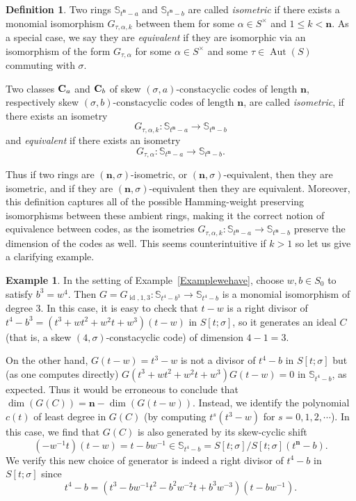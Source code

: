 \documentclass[11pt]{amsart}
\theoremstyle{plain}
\theoremstyle{definition}
\newtheorem{definition}[theorem]{Definition}
\newtheorem{example}[theorem]{Example}
\numberwithin{equation}{section}
\numberwithin{figure}{section}
\newcommand{\Sone}[1]{\Stsigma/\Stsigma (t^{\de}-#1)} %
\newcommand{\ring}{S}
\newcommand{\Stsigma}{S[t;\sigma]}
\DeclareMathOperator{\id}{id}
\newcommand{\de}{\mathbf{n}}  %
\DeclareMathOperator{\Aut}{Aut}
\begin{document}
\begin{definition}\label{D:isometric}
    Two rings $ \mathbb{S}_{t^\de -a}$ and $ \mathbb{S}_{t^\de -b}$
    are called \emph{isometric} if there exists a monomial isomorphism $G_{\tau,\alpha,k}$ between them for some $\alpha \in \ring^\times$ and $1\leq k<\de$. As a special case, we say they are \emph{equivalent} if they are isomorphic via an isomorphism of the form $G_{\tau,\alpha}$ for some $\alpha\in \ring^\times$ and some $\tau\in \Aut(\ring)$ commuting with $\sigma$.


Two classes ${\bf C}_a$  and ${\bf C}_b$ of skew $(\sigma,a)$-constacyclic codes of length $\de$, respectively skew $(\sigma,b)$-constacyclic codes of length $\de$, are called
 \emph{isometric}, if there exists an isometry
$$G_{\tau,\alpha,k}:  \mathbb{S}_{t^\de -a}\to  \mathbb{S}_{t^\de -b}
$$ and \emph{equivalent}  if there exists an isometry
$$G_{\tau,\alpha}: \mathbb{S}_{t^\de -a}\to  \mathbb{S}_{t^\de -b}.
$$
\end{definition}

Thus if two rings are $(\de,\sigma)$-isometric, or $(\de,\sigma)$-equivalent, then they are isometric, and if they are  $(\de,\sigma)$-equivalent then they are equivalent. Moreover, this definition captures all of the possible Hamming-weight preserving isomorphisms between these ambient rings, making it the correct notion of equivalence between codes, as the isometries $G_{\tau,\alpha,k}: \mathbb{S}_{t^\de -a}\to  \mathbb{S}_{t^\de -b}$
preserve the dimension of the codes as well. This seems counterintuitive if $k>1$ so let us give a clarifying example.


\begin{example}
    In the setting of Example~\ref{Examplewehave}, choose $w,b\in S_0$ to satisfy $b^3=w^4$.  Then $G=G_{\id,1,3}:\mathbb{S}_{t^4-b^3} \to \mathbb{S}_{t^4-b} 
    $ is a monomial isomorphism of degree $3$.  In this case, it is easy to check that $t-w$ is a right divisor of $t^4-b^3=(t^3+wt^2+w^2t+w^3)(t-w)$ in $\Stsigma$, so it generates an ideal $C$ (that is, a skew $(4,\sigma)$-constacyclic code) of dimension $4-1=3$.

    On the other hand,  $G(t-w)=t^3-w$ is not a divisor of $t^4-b$ in $\Stsigma$ but (as one computes directly) $G(t^3+wt^2+w^2t+w^3)G(t-w)=0$ in $\mathbb{S}_{t^4-b}$,
    as expected.  Thus it would be erroneous to conclude that $\dim(G(C))=\de-\dim(G(t-w))$.  Instead, we identify the polynomial $c(t)$ of least degree in $G(C)$ (by computing $t^s(t^3-w)$ for $s=0,1,2,\cdots$).  In this case, we find that $G(C)$ is also generated by its skew-cyclic shift $$(-w^{-1}t)(t-w) = t-bw^{-1} \in \mathbb{S}_{t^4-b}=\Sone{b}.$$  We verify this new choice of generator is indeed a right divisor of $t^4-b$ in $\Stsigma$ since
    $$
    t^4-b = (t^3-bw^{-1}t^2-b^2w^{-2}t+b^3w^{-3})(t-bw^{-1}).
    $$
\end{example}
\end{document}
